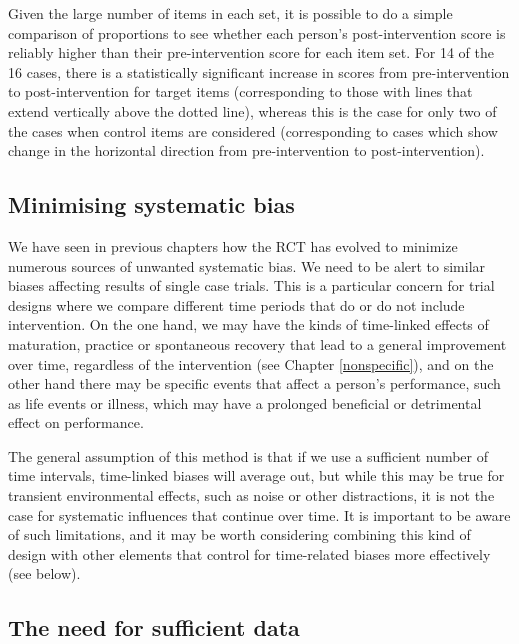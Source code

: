 \documentclass{krantz}
\begin{document}
Given the large number of items in each set, it is possible to do a simple comparison of proportions to see whether each person's post-intervention score is reliably higher than their pre-intervention score for each item set. For 14 of the 16 cases, there is a statistically significant increase in scores from pre-intervention to post-intervention for target items (corresponding to those with lines that extend vertically above the dotted line), whereas this is the case for only two of the cases when control items are considered (corresponding to cases which show change in the horizontal direction from pre-intervention to post-intervention).

\hypertarget{minimising-systematic-bias}{%
\subsection{Minimising systematic bias}\label{minimising-systematic-bias}}

We have seen in previous chapters how the RCT has evolved to minimize numerous sources of unwanted systematic bias. We need to be alert to similar biases affecting results of single case trials. This is a particular concern for trial designs where we compare different time periods that do or do not include intervention. On the one hand, we may have the kinds of time-linked effects of maturation, practice or spontaneous recovery that lead to a general improvement over time, regardless of the intervention (see Chapter \ref{nonspecific}), and on the other hand there may be specific events that affect a person's performance, such as life events or illness, which may have a prolonged beneficial or detrimental effect on performance.

The general assumption of this method is that if we use a sufficient number of time intervals, time-linked biases will average out, but while this may be true for transient environmental effects, such as noise or other distractions, it is not the case for systematic influences that continue over time. It is important to be aware of such limitations, and it may be worth considering combining this kind of design with other elements that control for time-related biases more effectively (see below).

\hypertarget{the-need-for-sufficient-data}{%
\subsection{The need for sufficient data}\label{the-need-for-sufficient-data}}
\end{document}
